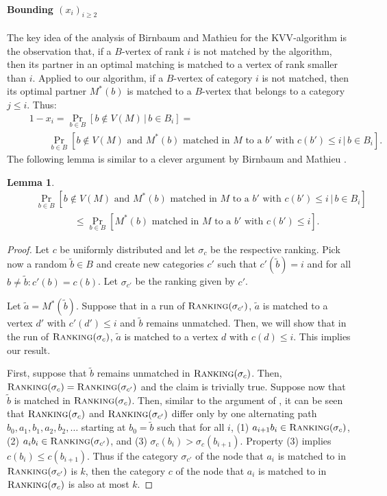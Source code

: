 \documentclass[a4paper]{article}
\newcommand{\Rank}{\textsc{Ranking}}
\newtheorem{lemma}{Lemma}
\begin{document}
\paragraph*{Bounding $(x_i)_{i \ge 2}$} The key idea of the analysis of Birnbaum and Mathieu for
the \textsc{KVV}-algorithm is the observation that, if a $B$-vertex of rank $i$ is not matched by the
algorithm, then its partner in an optimal matching is matched to a vertex of rank smaller than $i$.
Applied to our algorithm, if a $B$-vertex of category $i$ is not matched, then its optimal
partner $M^*(b)$ is matched to a $B$-vertex that belongs to a category $j \le i$. Thus:
\begin{eqnarray}
\nonumber \,\,& &  1 - x_i = \Pr_{b \in B} \left[ b \notin V(M) \, | \, b \in B_i \right]  = \\
& & \quad \quad \Pr_{b \in B} \left[ b \notin V(M) \text{ and } M^*(b) \text{ matched in $M$ to a $b'$ with $c(b') \le i$} \, | \, b \in B_i \right]. \label{eqn:456}
\end{eqnarray}
The following lemma is similar to a clever argument by Birnbaum and Mathieu \cite{bm08}.
\begin{lemma} \label{lem:birnbaum-mathieu}
\begin{eqnarray}
\nonumber \quad & & \Pr_{b \in B} \left[ b \notin V(M) \text{ and } M^*(b) \text{ matched in $M$ to a $b'$ with $c(b') \le i$} \, | \, b \in B_i \right] \\
& & \quad \quad \quad \quad \le \Pr_{b \in B} \left[ M^*(b) \text{ matched in $M$ to a $b'$ with $c(b') \le i$} \right]. \label{eqn:918}
\end{eqnarray}
\end{lemma}
\begin{proof}
 Let $c$ be uniformly distributed and let $\sigma_c$ be the respective ranking. Pick now a random
 $\tilde{b} \in B$ and create new categories $c'$ such that $c'(\tilde{b}) = i$ and for all
 $b \neq \tilde{b}: c'(b) = c(b)$. Let $\sigma_{c'}$ be the ranking given by $c'$.

 Let $\tilde{a} = M^*(\tilde{b})$. Suppose that in a run of $\Rank(\sigma_{c'})$, $\tilde{a}$ is matched
 to a vertex $d'$ with $c'(d') \le i$ and $\tilde{b}$ remains unmatched. Then, we will show that
 in the run of $\Rank(\sigma_c)$, $\tilde{a}$ is matched to a vertex $d$ with $c(d) \le i$. This implies
 our result.

 First, suppose that $\tilde{b}$ remains unmatched in $\Rank(\sigma_c)$. Then, $\Rank(\sigma_c) = \Rank(\sigma_{c'})$
 and the claim is trivially true. Suppose now that $\tilde{b}$ is matched in $\Rank(\sigma_c)$. Then, similar to
 the argument of \cite{bm08}, it can be seen that $\Rank(\sigma_c)$ and $\Rank(\sigma_{c'})$ differ only by
 one alternating path $b_0, a_1, b_1, a_2, b_2, \dots$ starting at $b_0 = \tilde{b}$ such that for all $i$,
  (1) $a_{i+1} b_i \in \Rank(\sigma_c)$,
  (2) $a_i b_i \in \Rank(\sigma_{c'})$, and
  (3) $\sigma_c(b_i) > \sigma_c(b_{i+1})$.
Property (3) implies $c(b_i) \le c(b_{i+1})$. Thus if the category $\sigma_{c'}$ of the node that $a_i$ is matched
to in $\Rank(\sigma_{c'})$ is $k$, then the category $c$ of the node that $a_i$ is matched to in $\Rank(\sigma_c)$ is
also at most $k$.
\end{proof}
\end{document}
